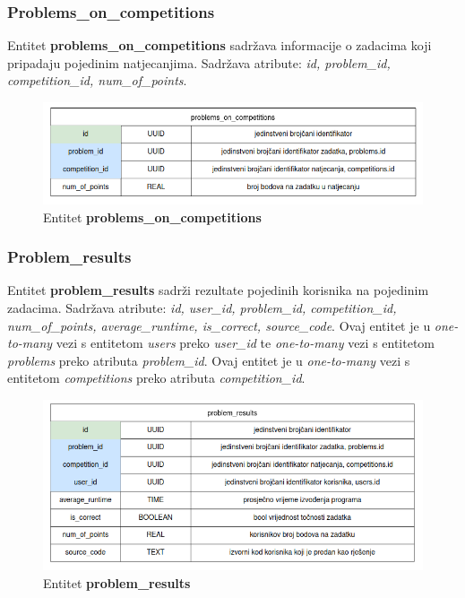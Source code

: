 		\subsubsection*{Problems\_on\_competitions}
		
		Entitet \textbf{problems\_on\_competitions} sadržava informacije o zadacima koji pripadaju pojedinim natjecanjima. Sadržava atribute: \textit{id, problem\_id, competition\_id, num\_of\_points}.
		
		\begin{figure}[htbp]
			\centering
			\includegraphics[width=\linewidth]{slike/problems_on_competitions_tablica.png}
			\caption{Entitet \textbf{problems\_on\_competitions}}
		\end{figure}
		
		\eject
		
		\subsubsection*{Problem\_results}
		
		Entitet \textbf{problem\_results} sadrži rezultate pojedinih korisnika na pojedinim zadacima. Sadržava atribute: \textit{id, user\_id, problem\_id, competition\_id, num\_of\_points, average\_runtime, is\_correct, source\_code}. Ovaj entitet je u \textit{one-to-many} vezi s entitetom \textit{users} preko \textit{user\_id} te \textit{one-to-many} vezi s entitetom \textit{problems} preko atributa \textit{problem\_id}. Ovaj entitet je u \textit{one-to-many} vezi s entitetom \textit{competitions} preko atributa \textit{competition\_id}.
		
		\begin{figure}[htbp]
			\centering
			\includegraphics[width=\linewidth]{slike/problem_results_tablica.png}
			\caption{Entitet \textbf{problem\_results}}
		\end{figure}
		
